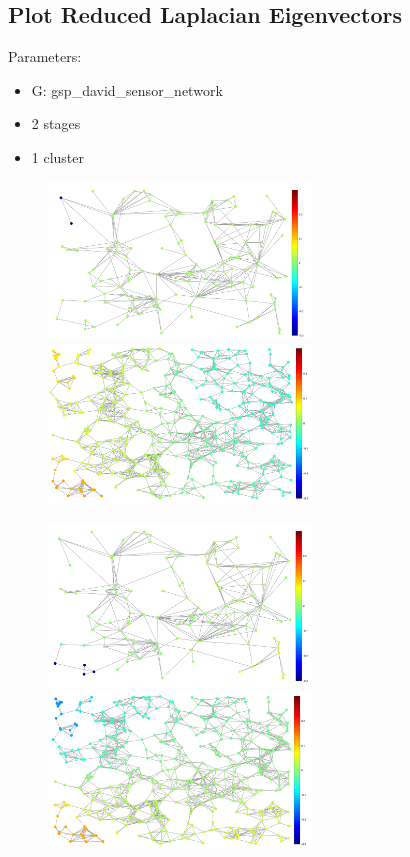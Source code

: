 \documentclass[a4paper]{article}
\begin{document}
\subsection{Plot Reduced Laplacian Eigenvectors}

Parameters:
\begin{itemize}
\item G: gsp\_david\_sensor\_network
\item 2 stages
\item 1 cluster
\end{itemize}

\begin{figure}[H]
\centering
\includegraphics[width = 7cm]{plot_eigenvectors/reduced_eigenvec_1}
\includegraphics[width = 7cm]{plot_eigenvectors/original_eigenvec_1}

\includegraphics[width = 7cm]{plot_eigenvectors/reduced_eigenvec_2}
\includegraphics[width = 7cm]{plot_eigenvectors/original_eigenvec_2}


\end{figure}
\end{document}
